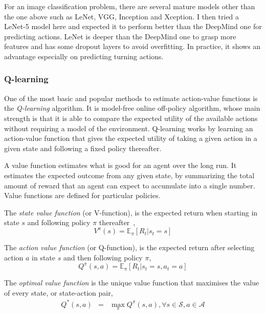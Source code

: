 \begin{itemize}
	For an image classification problem, there are several mature models other than the one above such as LeNet, VGG, Inception and Xception. I then tried a LeNet-5 model here and expected it to perform better than the DeepMind one for predicting actions. LeNet is deeper than the DeepMind one to grasp more features and has some dropout layers to avoid overfitting. In practice, it shows an advantage especially on predicting turning actions.
	
\end{itemize}

\subsubsection{Q-learning}

One of the most basic and popular methods to estimate action-value functions is the \emph{Q-learning} algorithm. It is model-free online off-policy algorithm, whose main strength is that it is able to compare the expected utility of the available actions without requiring a model of the environment. Q-learning works by learning an action-value function that gives the expected utility of taking a given action in a given state and following a fixed policy thereafter.

A value function estimates what is good for an agent over the long run. It estimates the expected outcome from any given state, by summarizing the total amount of reward that an agent can expect to accumulate into a single number. Value functions are defined for particular policies.

The \emph{state value function} (or V-function), is the expected return when starting in state $s$ and following policy $\pi$ thereafter~\citep{Sutton1998RL},
%
\begin{equation}
V^\pi(s) = \mathbb{E}_\pi \left[R_t | s_t = s \right]
\end{equation}

The \emph{action value function} (or Q-function), is the expected return after selecting action $a$ in state $s$ and then following policy $\pi$,
%
\begin{equation}
Q^\pi(s,a) = \mathbb{E}_\pi \left[ R_t | s_t = s, a_t = a \right]
\end{equation}

The \emph{optimal value function} is the unique value function that maximises the value of every state, or state-action pair,
%
\begin{eqnarray}
Q^*(s,a) & = & \max\limits_\pi Q^\pi(s,a), \forall s \in \mathcal{S}, a \in \mathcal{A}
\end{eqnarray}

